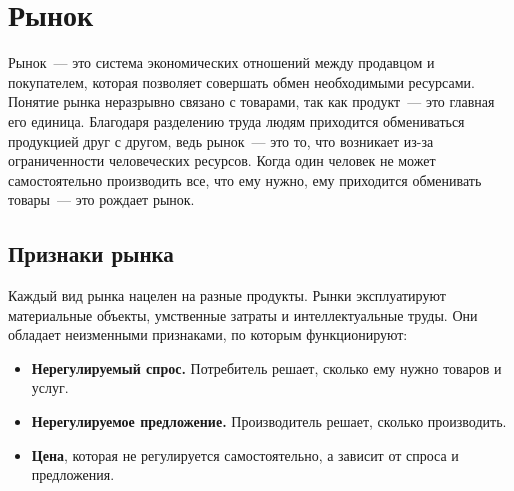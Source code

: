 \chapter{Рынок}

Рынок~--- это система экономических отношений между продавцом и покупателем, которая позволяет совершать обмен необходимыми ресурсами. 
Понятие рынка неразрывно связано с товарами, так как продукт~--- это главная его единица. 
Благодаря разделению труда людям приходится обмениваться продукцией друг с другом, ведь рынок~--- это то, что возникает из-за ограниченности человеческих ресурсов. 
Когда один человек не может самостоятельно производить все, что ему нужно, ему приходится обменивать товары~--- это рождает рынок.

\section{Признаки рынка}
Каждый вид рынка нацелен на разные продукты. 
Рынки эксплуатируют материальные объекты, умственные затраты и интеллектуальные труды. 
Они обладает неизменными признаками, по которым функционируют:
\begin{itemize}
	\item \textbf{Нерегулируемый спрос.} Потребитель решает, сколько ему нужно товаров и услуг.
	\item \textbf{Нерегулируемое предложение.} Производитель решает, сколько производить.
	\item \textbf{Цена}, которая не регулируется самостоятельно, а зависит от спроса и предложения.
\end{itemize}

